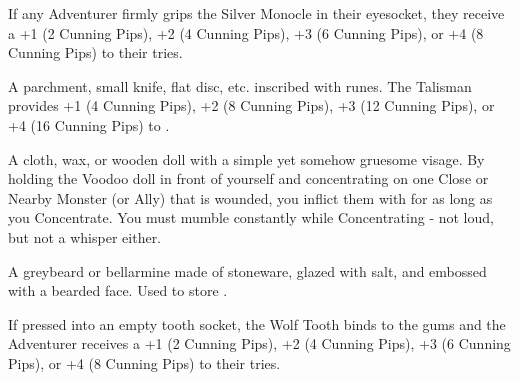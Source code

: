 \MARVELS[
  Name=Silver Monocle,
  Link=marvels-silver-monocle,
  Pips=2+
]

If any Adventurer firmly grips the Silver Monocle in their eyesocket, they receive a +1 (2 Cunning Pips), +2 (4 Cunning Pips), +3 (6 Cunning Pips), or +4 (8 Cunning Pips) to their  tries.

 
\MARVELS[
  Name=Talisman,
  Link=marvels-talisman,
  Pips=4+
]

A parchment, small knife, flat disc, etc. inscribed with runes. The Talisman provides +1 (4 Cunning Pips), +2 (8 Cunning Pips), +3 (12 Cunning Pips), or +4 (16 Cunning Pips) to .


\MARVELS[
  Name=Voodoo Doll,
  Link=marvels-voodoo-doll,
  Pips=12
]

A cloth, wax, or wooden doll with a simple yet somehow gruesome visage. By holding the Voodoo doll in front of yourself and concentrating on one Close or Nearby Monster (or Ally) that is wounded, you inflict them with  for as long as you Concentrate. You must mumble constantly while Concentrating - not loud, but not a whisper either.

\MARVELS[
  Name=Witch Bottle,
  Link=marvels-witch-bottle,
  Pips=2
]

A greybeard or bellarmine made of stoneware, glazed with salt, and embossed with a bearded face. Used to store .


\MARVELS[
  Name=Wolf Tooth,
  Link=marvels-wolf-tooth,
  Pips=2+
]

If pressed into an empty tooth socket, the Wolf Tooth binds to the gums and the Adventurer receives a +1 (2 Cunning Pips), +2 (4 Cunning Pips), +3 (6 Cunning Pips), or +4 (8 Cunning Pips) to their  tries.



